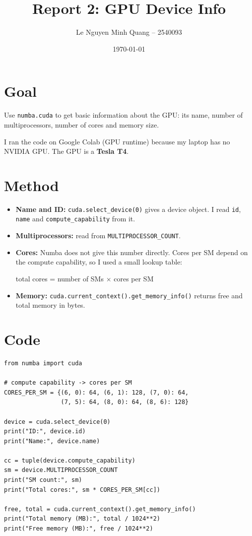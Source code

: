 \documentclass[11pt,a4paper]{article}
\title{Report 2: GPU Device Info}
\author{Le Nguyen Minh Quang -- 2540093}
\date{\today}
\begin{document}
\maketitle

\section{Goal}
Use \texttt{numba.cuda} to get basic information about the GPU:
its name, number of multiprocessors, number of cores and memory size.

I ran the code on Google Colab (GPU runtime) because my laptop has no
NVIDIA GPU. The GPU is a \textbf{Tesla T4}.

\section{Method}
\begin{itemize}
  \item \textbf{Name and ID:} \texttt{cuda.select\_device(0)} gives a
  device object. I read \texttt{id}, \texttt{name} and
  \texttt{compute\_capability} from it.
  \item \textbf{Multiprocessors:} read from
  \texttt{MULTIPROCESSOR\_COUNT}.
  \item \textbf{Cores:} Numba does not give this number directly.
  Cores per SM depend on the compute capability, so I used a small
  lookup table:
  \begin{center}
    total cores = number of SMs $\times$ cores per SM
  \end{center}
  \item \textbf{Memory:} \texttt{cuda.current\_context().get\_memory\_info()}
  returns free and total memory in bytes.
\end{itemize}

\section{Code}
\begin{verbatim}
from numba import cuda

# compute capability -> cores per SM
CORES_PER_SM = {(6, 0): 64, (6, 1): 128, (7, 0): 64,
                (7, 5): 64, (8, 0): 64, (8, 6): 128}

device = cuda.select_device(0)
print("ID:", device.id)
print("Name:", device.name)

cc = tuple(device.compute_capability)
sm = device.MULTIPROCESSOR_COUNT
print("SM count:", sm)
print("Total cores:", sm * CORES_PER_SM[cc])

free, total = cuda.current_context().get_memory_info()
print("Total memory (MB):", total / 1024**2)
print("Free memory (MB):", free / 1024**2)
\end{verbatim}
\end{document}
